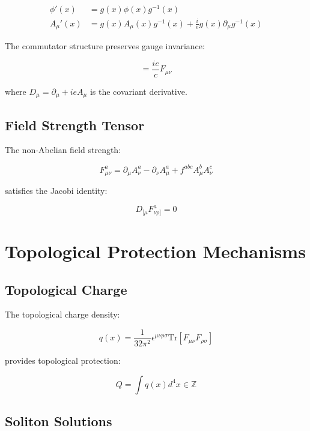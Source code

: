 \documentclass[12pt,a4paper]{article}
\begin{document}
\begin{align}
\phi'(x) &= g(x) \phi(x) g^{-1}(x) \\
A_\mu'(x) &= g(x) A_\mu(x) g^{-1}(x) + \frac{i}{e} g(x) \partial_\mu g^{-1}(x)
\end{align}

The commutator structure preserves gauge invariance:

\begin{equation}
[D_\mu, D_\nu] = \frac{ie}{c} F_{\mu\nu}
\end{equation}

where $D_\mu = \partial_\mu + ieA_\mu$ is the covariant derivative.

\subsection{Field Strength Tensor}

The non-Abelian field strength:

\begin{equation}
F_{\mu\nu}^a = \partial_\mu A_\nu^a - \partial_\nu A_\mu^a + f^{abc} A_\mu^b A_\nu^c
\end{equation}

satisfies the Jacobi identity:

\begin{equation}
D_{[\mu} F_{\nu\rho]}^a = 0
\end{equation}

\section{Topological Protection Mechanisms}

\subsection{Topological Charge}

The topological charge density:

\begin{equation}
q(x) = \frac{1}{32\pi^2} \epsilon^{\mu\nu\rho\sigma} \text{Tr}[F_{\mu\nu} F_{\rho\sigma}]
\end{equation}

provides topological protection:

\begin{equation}
Q = \int q(x) d^4x \in \mathbb{Z}
\end{equation}

\subsection{Soliton Solutions}
\end{document}
